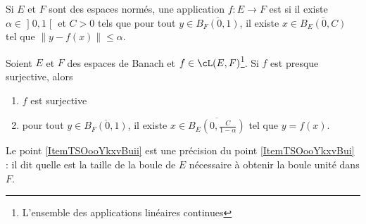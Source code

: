 \begin{definition}
Si \( E\) et \( F\) sont des espaces normés, une application \( f\colon E\to F\) est  si il existe \( \alpha\in\mathopen] 0 , 1 \mathclose[\) et \( C>0\) tels que pour tout \( y\in \overline{ B_F(0,1) }\), il existe \( x\in\overline{ B_E(0,C) }\) tel que \( \| y-f(x) \|\leq \alpha\).
\end{definition}

\begin{lemma}   \label{LemBQLooRXhJzK}
    Soient \( E\) et \( F\) des espaces de Banach et \( f\in\cL(E,F)\)\footnote{L'ensemble des applications linéaires continues}. Si \( f\) est presque surjective, alors
    \begin{enumerate}
        \item   \label{ItemTSOooYkxvBui}
            \( f\) est surjective
        \item\label{ItemTSOooYkxvBuii}
            pour tout \( y\in \overline{ B_F(0,1) }\), il existe \( x\in\overline{ B_E(0,\frac{ C }{ 1-\alpha }) }\) tel que \( y=f(x)\).
    \end{enumerate}
\end{lemma}
Le point \ref{ItemTSOooYkxvBuii} est une précision du point \ref{ItemTSOooYkxvBui} : il dit quelle est la taille de la boule de \( E\) nécessaire à obtenir la boule unité dans \( F\).

